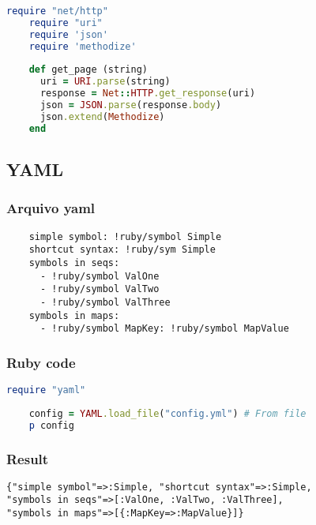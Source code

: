 \documentclass[serif,mathserif]{article}
\begin{document}
\begin{lstlisting}[language=ruby]
	require "net/http"
	require "uri"
	require 'json'
	require 'methodize'
	
	def get_page (string)
	  uri = URI.parse(string)
	  response = Net::HTTP.get_response(uri)
	  json = JSON.parse(response.body)
	  json.extend(Methodize)
	end
\end{lstlisting}

\subsection{YAML}

\subsubsection{Arquivo yaml}

\begin{verbatim}
	simple symbol: !ruby/symbol Simple 
	shortcut syntax: !ruby/sym Simple 
	symbols in seqs: 
	  - !ruby/symbol ValOne 
	  - !ruby/symbol ValTwo 
	  - !ruby/symbol ValThree 
	symbols in maps: 
	  - !ruby/symbol MapKey: !ruby/symbol MapValue 
\end{verbatim}

\subsubsection{Ruby code}

\begin{lstlisting}[language=ruby]
	require "yaml"
	
	config = YAML.load_file("config.yml") # From file
	p config
\end{lstlisting}

\subsubsection{Result}

\begin{verbatim}
{"simple symbol"=>:Simple, "shortcut syntax"=>:Simple, 
"symbols in seqs"=>[:ValOne, :ValTwo, :ValThree], 
"symbols in maps"=>[{:MapKey=>:MapValue}]}
\end{verbatim}
\end{document}
